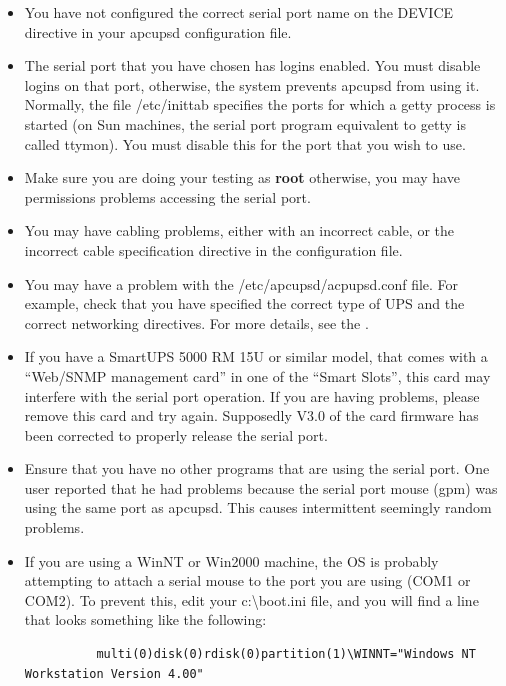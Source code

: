 {{{{{{{\begin{itemize}
\item You have not configured the correct serial port name on the DEVICE
   directive in your apcupsd configuration file.  
\item The serial port that you have chosen has logins enabled. You must
   disable logins on that port, otherwise, the system prevents apcupsd from using
   it. Normally, the file /etc/inittab specifies the ports for which a getty
process is started (on Sun machines, the serial port program equivalent to
getty is called ttymon). You must disable this for the port that you wish to
use.  
\item Make sure you are doing your testing as {\bf root} otherwise, you may
   have permissions problems accessing the serial port.  
\item You may have cabling problems, either with an incorrect cable, or the
   incorrect cable specification directive in the configuration file.  
\item You may have a problem with the /etc/apcupsd/acpupsd.conf file. For
   example, check that you have specified the correct type of UPS and the correct
   networking directives.  For more details, see the 
.  
\item If you have a SmartUPS 5000 RM 15U or similar model, that comes with a
   ``Web/SNMP management card'' in one of the ``Smart Slots'', this card may
   interfere with the serial port operation. If you are having problems, please
remove this card and try again. Supposedly V3.0 of the card firmware has been
corrected to properly release the serial port.  
\item Ensure that you have no other programs that are using the serial port.
   One user reported that he had problems because the serial port mouse (gpm) was
   using the same port as apcupsd. This causes intermittent seemingly random
problems.  
\item If you are using a WinNT or Win2000 machine, the OS is probably
   attempting to attach a serial mouse to the port you are using (COM1 or COM2).
   To prevent this, edit your c:\textbackslash{}boot.ini file, and you will find
a line that looks something like the following:  

\footnotesize
\begin{verbatim}
          multi(0)disk(0)rdisk(0)partition(1)\WINNT="Windows NT Workstation Version 4.00"
     
\end{verbatim}
\normalsize


\end{itemize}}}}}}}}
